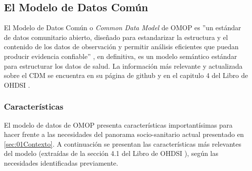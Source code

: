 \subsection{El Modelo de Datos Común} \label{subsec:05cdm}

El Modelo de Datos Común o \textit{Common Data Model} de OMOP es ''un estándar de datos comunitario abierto, diseñado para estandarizar la estructura y el contenido de los datos de observación y permitir análisis eficientes que puedan producir evidencia confiable'' \cite{gitPagesCMD}, en definitiva, es un modelo semántico estándar para estructurar los datos de salud. La información más relevante y actualizada sobre el CDM se encuentra en su página de github \cite{gitPagesCMD} y en el capitulo 4 del Libro de OHDSI \cite{OHDSIbook}.

\subsubsection{Características}

El modelo de datos de OMOP presenta características importantísimas para hacer frente a las necesidades del panorama socio-sanitario actual presentado en \ref{sec:01Contexto}. A continuación se presentan las características más relevantes del modelo (extraídas de la sección  4.1 del Libro de OHDSI \cite{OHDSIbook}), según las necesidades identificadas previamente.

